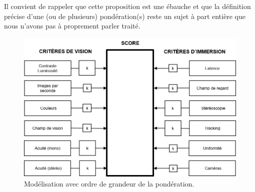 \par Il convient de rappeler que cette proposition est une ébauche et que la définition précise d'une (ou de plusieurs) pondération(s) reste un sujet à part entière que nous n'avons pas à proprement parler traité.

\begin{figure}
	\centering
	\includegraphics[scale=1]{Figures/ModeleDefinitifPondere}
	\caption{Modélisation avec ordre de grandeur de la pondération.}
	\label{fig:modèle_définitif_pondere}
\end{figure}